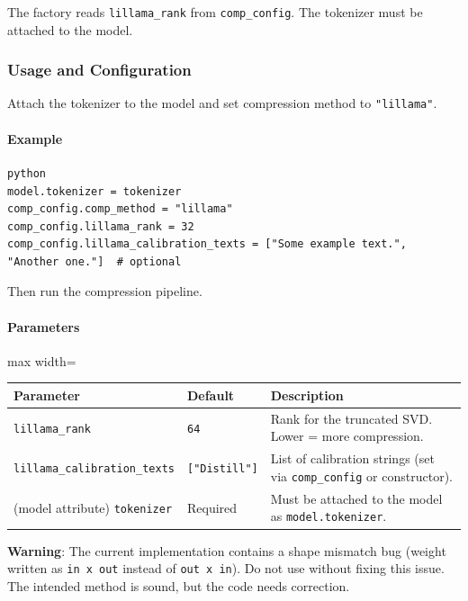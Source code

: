 The factory reads \texttt{lillama\_rank} from \texttt{comp\_config}. The tokenizer must be attached to the model.


\subsubsection*{Usage and Configuration}

Attach the tokenizer to the model and set compression method to \texttt{"lillama"}.

\paragraph{Example}

\vspace{0.5em}
\begin{mdframed}[backgroundcolor=codebg, linecolor=codeframe, linewidth=1pt, roundcorner=4pt, innerleftmargin=2pt, innerrightmargin=5pt, innertopmargin=5pt, innerbottommargin=5pt]
\begin{lstlisting}
python
model.tokenizer = tokenizer
comp_config.comp_method = "lillama"
comp_config.lillama_rank = 32
comp_config.lillama_calibration_texts = ["Some example text.", "Another one."]  # optional
\end{lstlisting}
\end{mdframed}
\vspace{0.5em}

Then run the compression pipeline.

\paragraph{Parameters}

\begin{center}
\begin{adjustbox}{max width=\columnwidth}
\renewcommand{\arraystretch}{1.2}
\begin{tabular}{lll}
\toprule
Parameter & Default & Description \\
\midrule
\texttt{lillama\_rank} & \texttt{64} & Rank for the truncated SVD. Lower = more compression. \\
\texttt{lillama\_calibration\_texts} & \texttt{["Distill"]} & List of calibration strings (set via \texttt{comp\_config} or constructor). \\
(model attribute) \texttt{tokenizer} & Required & Must be attached to the model as \texttt{model.tokenizer}. \\

\bottomrule
\end{tabular}
\end{adjustbox}
\end{center}
\textbf{Warning}: The current implementation contains a shape mismatch bug (weight written as \texttt{in x out} instead of \texttt{out x in}). Do not use without fixing this issue. The intended method is sound, but the code needs correction.


